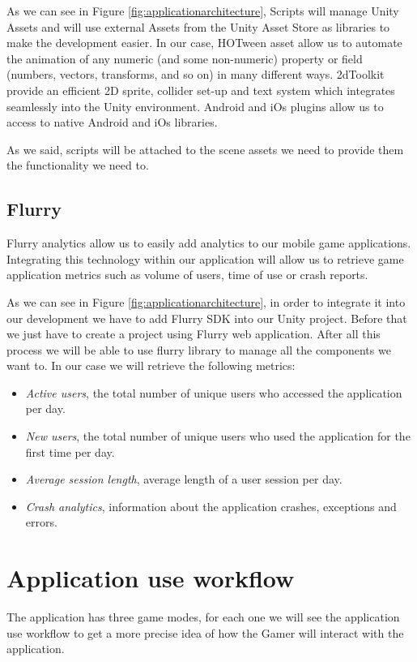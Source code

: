 As we can see in Figure \ref{fig:applicationarchitecture}, Scripts will manage Unity Assets and will use external Assets from the Unity Asset Store as libraries to make the development easier. In our case, HOTween asset allow us to automate the animation of any numeric (and some non-numeric) property or field (numbers, vectors, transforms, and so on) in many different ways. 2dToolkit provide an efficient 2D sprite, collider set-up and text system which integrates seamlessly into the Unity environment. Android and iOs plugins allow us to access to native Android and iOs libraries.

As we said, scripts will be attached to the scene assets we need to provide them the functionality we need to.

\subsection{Flurry}
Flurry analytics allow us to easily add analytics to our mobile game applications. Integrating this technology within our application will allow us to retrieve game application metrics such as volume of users, time of use or crash reports.

As we can see in Figure \ref{fig:applicationarchitecture}, in order to integrate it into our development we have to add Flurry SDK into our Unity project. Before that we just have to create a project using Flurry web application. After all this process we will be able to use flurry library to manage all the components we want to. In our case we will retrieve the following metrics:

\begin{itemize}
\item \textit{Active users}, the total number of unique users who accessed the application per day.
\item \textit{New users}, the total number of unique users who used the application for the first time per day.
\item \textit{Average session length}, average length of a user session per day.
\item \textit{Crash analytics}, information about the application crashes, exceptions and errors.
\end{itemize}

\section{Application use workflow}
The application has three game modes, for each one we will see the application use workflow to get a more precise idea of how the Gamer will interact with the application.

